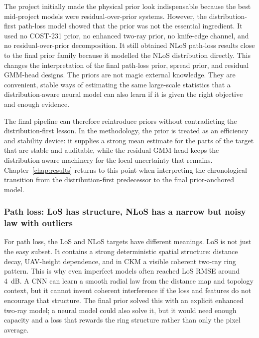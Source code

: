 The project initially made the physical prior look indispensable because the
best mid-project models were residual-over-prior systems. However, the
distribution-first path-loss model showed that the prior was not the essential
ingredient. It
used no COST-231 prior, no enhanced two-ray prior, no knife-edge channel, and
no residual-over-prior decomposition. It still obtained NLoS path-loss results
close to the final prior family because it modelled the NLoS distribution
directly. This changes the interpretation of the final path-loss prior,
spread prior, and residual GMM-head designs. The priors are not magic
external knowledge. They are convenient, stable ways of estimating the same
large-scale statistics that a distribution-aware neural model can also learn
if it is given the right objective and enough evidence.

The final pipeline can therefore reintroduce priors without contradicting the
distribution-first lesson. In the methodology, the prior is treated as an
efficiency and stability device: it supplies a strong mean estimate for the
parts of the target that are stable and auditable, while the residual GMM-head
keeps the distribution-aware machinery for the local uncertainty that remains.
Chapter~\ref{chap:results} returns to this point when interpreting the
chronological transition from the distribution-first predecessor to the final
prior-anchored model.

\subsubsection{Path loss: LoS has structure, NLoS has a narrow but noisy law with outliers}

For path loss, the LoS and NLoS targets have different meanings. LoS is not
just the easy subset. It contains a strong deterministic spatial structure:
distance decay, UAV-height dependence, and in CKM a visible coherent two-ray
ring pattern. This is why even imperfect models often reached LoS RMSE around
\SI{4}{dB}. A CNN can learn a smooth radial law from the distance map and
topology context, but it cannot invent coherent interference if the loss and
features do not encourage that structure. The final prior solved this with an
explicit enhanced two-ray model; a neural model could also solve it, but it
would need enough capacity and a loss that rewards the ring structure rather
than only the pixel average.

